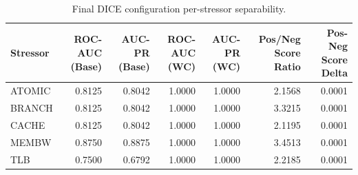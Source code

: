 \begin{table}[t]
\centering
\caption{Final DICE configuration per-stressor separability.}
\label{tab:dice_full_stressor}
\footnotesize
\begin{tabular}{lrrrrrr}
\toprule
Stressor & ROC-AUC (Base) & AUC-PR (Base) & ROC-AUC (WC) & AUC-PR (WC) & Pos/Neg Score Ratio & Pos-Neg Score Delta \\
\midrule
ATOMIC & 0.8125 & 0.8042 & 1.0000 & 1.0000 & 2.1568 & 0.0001 \\
BRANCH & 0.8125 & 0.8042 & 1.0000 & 1.0000 & 3.3215 & 0.0001 \\
CACHE & 0.8125 & 0.8042 & 1.0000 & 1.0000 & 2.1195 & 0.0001 \\
MEMBW & 0.8750 & 0.8875 & 1.0000 & 1.0000 & 3.4513 & 0.0001 \\
TLB & 0.7500 & 0.6792 & 1.0000 & 1.0000 & 2.2185 & 0.0001 \\
\bottomrule
\end{tabular}

\end{table}
